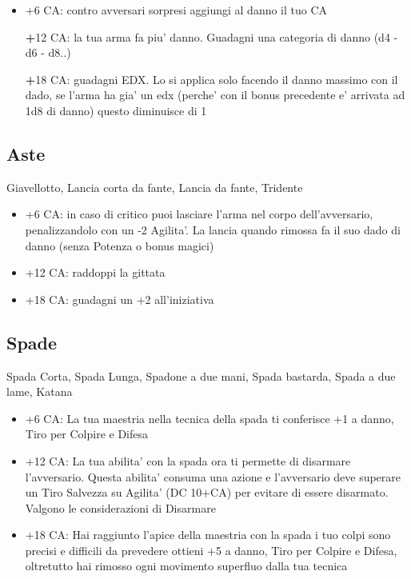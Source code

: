 \documentclass[a4paper,11pt,twoside,openany]{book}
\begin{document}
	\begin{itemize}
		
		\item +6 CA: contro avversari sorpresi aggiungi al danno il tuo CA
		
		\textbf +12 CA: la tua arma fa piu' danno. Guadagni una categoria di danno (d4 - d6 - d8..)
		
		\textbf +18 CA: guadagni EDX. Lo si applica solo facendo il danno massimo con il dado, se l'arma ha gia' un edx (perche' con il bonus precedente e' arrivata ad 1d8 di danno)
		questo diminuisce di 1
		
	\end{itemize}
	
	\subsection{Aste} Giavellotto, Lancia corta da fante, Lancia da fante, Tridente
	
	\begin{itemize}
		
		\item +6 CA: in caso di critico puoi lasciare l'arma nel corpo dell'avversario,
		penalizzandolo con un -2 Agilita'. La lancia quando rimossa fa il suo dado di danno (senza
		Potenza o bonus magici)
		
		\item +12 CA: raddoppi la gittata
		
		\item +18 CA: guadagni un +2 all'iniziativa
	\end{itemize}
	
	\subsection{Spade} Spada Corta, Spada Lunga, Spadone a due mani, Spada bastarda, Spada a due lame, Katana
	
	\begin{itemize}
		
		\item +6 CA: La tua maestria nella tecnica della spada ti conferisce +1
		a danno, Tiro per Colpire e Difesa
		
		\item +12 CA: La tua abilita' con la spada ora ti permette di disarmare l'avversario. Questa abilita' consuma una azione e l'avversario deve superare un Tiro Salvezza su Agilita' (DC 10+CA) per evitare di essere disarmato. Valgono le considerazioni di Disarmare
		
		\item +18 CA: Hai raggiunto l'apice della maestria con la spada i tuo colpi sono precisi e difficili da prevedere ottieni +5 a danno, Tiro per Colpire e Difesa, oltretutto hai rimosso ogni movimento superfluo dalla tua tecnica
	\end{itemize}
	
\end{document}

